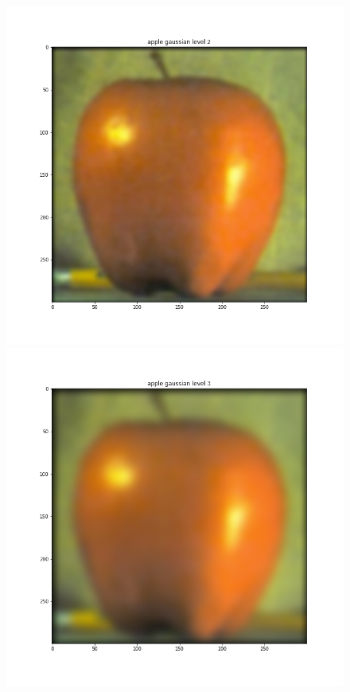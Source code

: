 \documentclass{article}
\begin{document}
\begin{figure}[!htb]
\endminipage
{}
    \includegraphics[width=\linewidth]{apple gaussian level 2.png}
\endminipage
{}
    \includegraphics[width=\linewidth]{apple gaussian level 3.png}

\end{figure}
\end{document}
